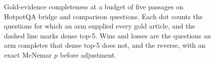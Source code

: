 \begin{figure}[t]
\caption{Gold-evidence completeness at a budget of five passages on HotpotQA
bridge and comparison questions. Each dot counts the questions for which an
arm supplied every gold article, and the dashed line marks dense top-5. Wins
and losses are the questions an arm completes that dense top-5 does not, and
the reverse, with an exact McNemar $p$ before adjustment.}
\label{fig:rq1}
\end{figure}
